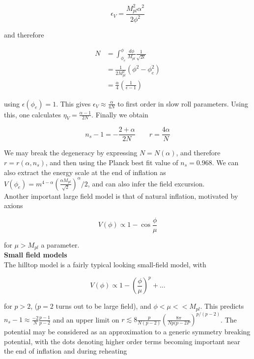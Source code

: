\documentclass[a4paper,10pt]{article}
\newcommand{\Mp}{M_{pl}}
\begin{document}
\begin{equation}
\epsilon_V = \frac{\Mp^2\alpha^2}{2\phi^2}
\end{equation}

and therefore

\begin{equation}
\begin{split}
N &= \int_{\phi_e}^\phi \frac{d\phi}{\Mp}\frac{1}{\sqrt{2\epsilon}} \\
&= \frac{1}{2\Mp^2}(\phi^2-\phi^2_e)\\
&= \frac{\alpha}{4}(\frac{1}{\epsilon-1})
\end{split}
\end{equation}

using $\epsilon(\phi_e)=1$. This gives $\epsilon_V \approx \frac{\alpha}{4N}$ to first order in slow roll parameters. Using this, one calculates $\eta_V=\frac{\alpha-1}{2N}$. Finally we obtain

\begin{equation}
n_s-1 = -\frac{2+\alpha}{2N} \qquad r=\frac{4\alpha}{N}
\end{equation}

We may break the degeneracy by expressing  $N=N(\alpha)$, and therefore $r=r(\alpha, n_s)$, and then using the Planck best fit value of $n_s=0.968$. We can also extract the energy scale at the end of inflation as  $V(\phi_e)=m^{4-\alpha}(\frac{\alpha\Mp}{\sqrt{2}})^\alpha/2$, and can also infer the field excursion.\\

Another important large field model is that of natural inflation, motivated by axions

\begin{equation}
V(\phi) \propto 1-\cos\frac{\phi}{\mu}
\end{equation}

for $\mu>\Mp$ a parameter.\\

\textbf{Small field models} \\

The hilltop model is a fairly typical looking small-field model, with

\begin{equation}
V(\phi) \propto 1-(\frac{\phi}{\mu})^p + ... 
\end{equation}

for $p>2$, ($p=2$ turns out to be large field), and $\phi<\mu<<\Mp$. This predicts $n_s-1 \approx \frac{-2}{N}\frac{p-1}{p-2}$ and an upper limit on $r\lesssim 8\frac{p}{N(p-2)}(\frac{8\pi}{Np(p-2P})^{p/(p-2)}$. The potential may be considered as an approximation to a generic symmetry breaking potential, with the dots denoting higher order terms becoming important near the end of inflation and during reheating \\
\end{document}
